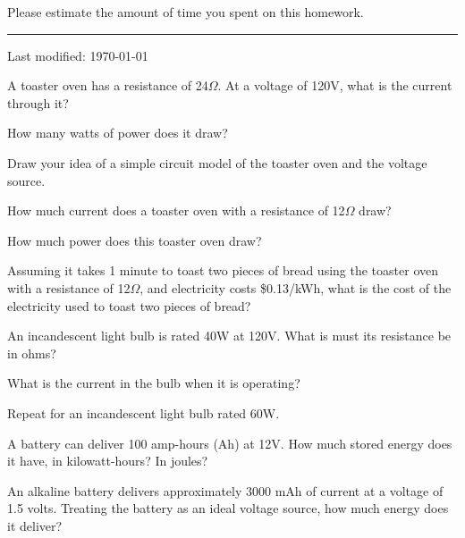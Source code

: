 \documentclass{article}
\begin{document}
Please estimate the amount of time you spent on this homework.

\newpage
\setcounter{problem}{0}
\setcounter{page}{1}

\hrule
\vspace{10pt}

{\tiny Last modified: \today}





\subproblem
A toaster oven has a resistance of 24$\Omega$.  At a voltage of 120V,
what is the current through it?

\subproblem
How many watts of power does it draw?

\subproblem
Draw your idea of a simple circuit model of the toaster oven and the
voltage source.

\subproblem
How much current does a toaster oven with a resistance of
12$\Omega$ draw?

\subproblem
How much power does this toaster oven draw?

\subproblem
Assuming it takes 1 minute to toast two pieces of bread using the
toaster oven with a resistance of 12$\Omega$, and electricity costs
\$0.13/kWh, what is the cost of the electricity used to toast two
pieces of bread?




\subproblem
An incandescent light bulb is rated 40W at 120V.  What is must its
resistance be in ohms?

\subproblem
What is the current in the bulb when it is operating?

\subproblem
Repeat for an incandescent light bulb rated 60W.



\subproblem
A battery can deliver 100 amp-hours (Ah) at 12V.  How much stored
energy does it have, in kilowatt-hours?  In joules?

\subproblem
An alkaline battery delivers approximately 3000 mAh of current at a
voltage of 1.5 volts.  Treating the battery as an ideal voltage source,
how much energy does it deliver?

\end{document}
